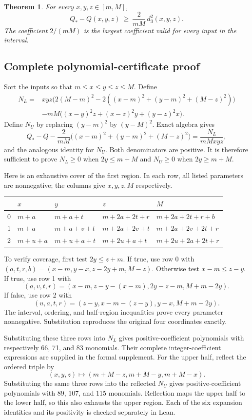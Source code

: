 \documentclass[11pt]{article}
\newtheorem{theorem}{Theorem}
\begin{document}
\begin{theorem}\label{thm:three}
For every $x,y,z\in[m,M]$,
\[
 Q_*-Q(x,y,z)\ \ge\ \frac{2}{mM}\,d_3^2(x,y,z).
\]
The coefficient $2/(mM)$ is the largest coefficient valid for every
input in the interval.
\end{theorem}

\subsection{Complete polynomial-certificate proof}
Sort the inputs so that $m\le x\le y\le z\le M$. Define
\begin{align*}
 N_L={}&xyz\big(2(M-m)^2-2((x-m)^2+(y-m)^2+(M-z)^2)\big)\\
       &-mM\big((x-y)^2z+(x-z)^2y+(y-z)^2x\big).
\end{align*}
Define $N_U$ by replacing $(y-m)^2$ by $(y-M)^2$.
Exact algebra gives
\[
 Q_*-Q-\frac{2}{mM}\big((x-m)^2+(y-m)^2+(M-z)^2\big)
   =\frac{N_L}{mMxyz},
\]
and the analogous identity for $N_U$. Both denominators are positive.
It is therefore sufficient to prove $N_L\ge0$ when $2y\le m+M$ and
$N_U\ge0$ when $2y\ge m+M$.

Here is an exhaustive cover of the first region. In each row, all listed
parameters are nonnegative; the columns give $x,y,z,M$ respectively.
\begin{center}\small
\begin{tabular}{@{}cllll@{}}
\toprule
 & $x$ & $y$ & $z$ & $M$\\
\midrule
0 & $m+a$ & $m+a+t$ & $m+2a+2t+r$ & $m+2a+2t+r+b$\\
1 & $m+a$ & $m+a+v+t$ & $m+2a+2v+t$ & $m+2a+2v+2t+r$\\
2 & $m+u+a$ & $m+u+a+t$ & $m+2u+a+t$ & $m+2u+2a+2t+r$\\
\bottomrule
\end{tabular}
\end{center}
To verify coverage, first test $2y\le z+m$. If true, use row 0 with
$(a,t,r,b)=(x-m,y-x,z-2y+m,M-z)$. Otherwise test $x-m\le z-y$.
If true, use row 1 with
\[
 (a,v,t,r)=(x-m,z-y-(x-m),2y-z-m,M+m-2y).
\]
If false, use row 2 with
\[
 (u,a,t,r)=(z-y,x-m-(z-y),y-x,M+m-2y).
\]
The interval, ordering, and half-region inequalities prove every parameter
nonnegative. Substitution reproduces the original four coordinates exactly.

Substituting these three rows into $N_L$ gives positive-coefficient
polynomials with respectively 66, 71, and 83 monomials. Their complete
integer-coefficient expressions are supplied in the formal supplement.
For the upper half, reflect the ordered triple by
\[
 (x,y,z)\longmapsto(m+M-z,m+M-y,m+M-x).
\]
Substituting the same three rows into the reflected $N_U$ gives
positive-coefficient polynomials with 89, 107, and 115 monomials.
Reflection maps the upper half to the lower half, so this also exhausts
the upper region. Each of the six expansion identities and its positivity
is checked separately in Lean.
\end{document}
